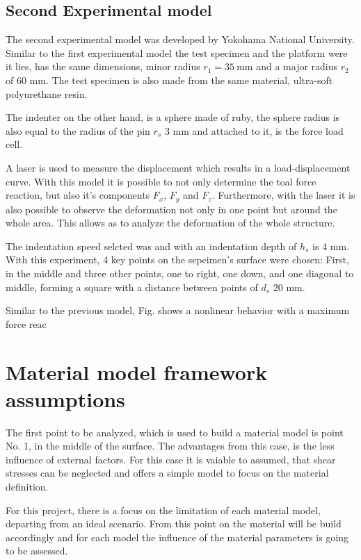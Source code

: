 \subsection{Second Experimental model}
The second experimental model was developed by Yokohama National University. Similar to 
the first experimental model the test specimen and the platform were it lies, has the 
same dimensions, minor radius $r_1 = \SI{35}{\milli \m}$ and a major radius \(r_2\) of 60 mm. The
test specimen is also made from the same material, ultra-soft polyurethane resin.

The indenter on the other hand, is a sphere made of ruby, the sphere radius is also 
equal to the radius of the pin \(r_s\) 3 mm and attached to it, is the force load cell.

A laser is used to measure the displacement which results in a load-displacement curve.
With this model it is possible to not only determine the toal force reaction, but also
it's components \(F_x\),  \(F_y\) and \(F_z\). Furthermore, with the laser it is also
possible to observe the deformation not only in one point but around the whole area. 
This allows as to analyze the deformation of the whole structure.

The indentation speed selcted was %
and with an indentation depth of \(h_s\) is 4 mm. With this experiment, 4 key points on 
the sepcimen's surface were chosen: First, in the middle and three other points, one to right, 
one down, and one diagonal to middle, forming a square with a distance between points 
of \(d_s\) 20 mm. %




Similar to the previous model, Fig. %
shows a nonlinear behavior with a maximum force reac


\section{Material model framework assumptions}

The first point to be analyzed, which is used to build a material model is point No. 1,
in the middle of the surface. The advantages from this case, is the less influence of
external factors. For this case it is vaiable to assumed, that shear stresses can be 
neglected and offers a simple model to focus on the material definition.

For this project, there is a focus on the limitation of each material model, 
departing from an ideal scenario. From this point on the material will be build 
accordingly and for each model the influence of the material parameters is going
to be assessed.

